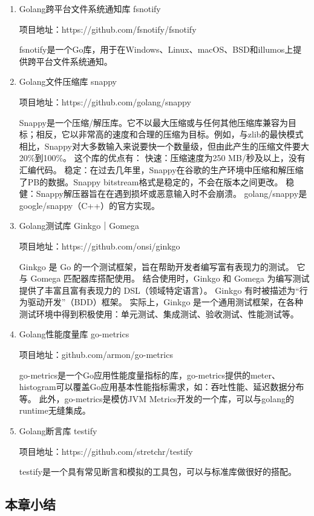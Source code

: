 	\begin{enumerate}[fullwidth,itemindent=2em,listparindent=2em]
	
		\item Golang跨平台文件系统通知库 fsnotify
		
		项目地址：https://github.com/fsnotify/fsnotify

		fsnotify是一个Go库，用于在Windows、Linux、macOS、BSD和illumos上提供跨平台文件系统通知。

		\item Golang文件压缩库 snappy
		
		项目地址：https://github.com/golang/snappy

		Snappy是一个压缩/解压库。它不以最大压缩或与任何其他压缩库兼容为目标；相反，它以非常高的速度和合理的压缩为目标。例如，与zlib的最快模式相比，Snappy对大多数输入来说要快一个数量级，但由此产生的压缩文件要大20\%到100\%。
		这个库的优点有：
		快速：压缩速度为250 MB/秒及以上，没有汇编代码。
		稳定：在过去几年里，Snappy在谷歌的生产环境中压缩和解压缩了PB的数据。Snappy bitstream格式是稳定的，不会在版本之间更改。
		稳健：Snappy解压器旨在在遇到损坏或恶意输入时不会崩溃。
		golang/snappy是google/snappy（C++）的官方实现。

		\item Golang测试库 Ginkgo｜Gomega
		
		项目地址：https://github.com/onsi/ginkgo

		Ginkgo 是 Go 的一个测试框架，旨在帮助开发者编写富有表现力的测试。 
		它与 Gomega 匹配器库搭配使用。 
		结合使用时，Ginkgo 和 Gomega 为编写测试提供了丰富且富有表现力的 DSL（领域特定语言）。
		Ginkgo 有时被描述为“行为驱动开发”（BDD）框架。 
		实际上，Ginkgo 是一个通用测试框架，在各种测试环境中得到积极使用：单元测试、集成测试、验收测试、性能测试等。
		
		\item Golang性能度量库 go-metrics
		
		项目地址：github.com/armon/go-metrics 
		
		go-metrics是一个Go应用性能度量指标的库，go-metrics提供的meter、histogram可以覆盖Go应用基本性能指标需求，如：吞吐性能、延迟数据分布等。
		此外，go-metrics是模仿JVM Metrics开发的一个库，可以与golang的runtime无缝集成。
		
		
		\item Golang断言库 testify
		
		项目地址：https://github.com/stretchr/testify

		testify是一个具有常见断言和模拟的工具包，可以与标准库做很好的搭配。
		

	\end{enumerate}
	
	\subsection{本章小结}
	
\clearpage